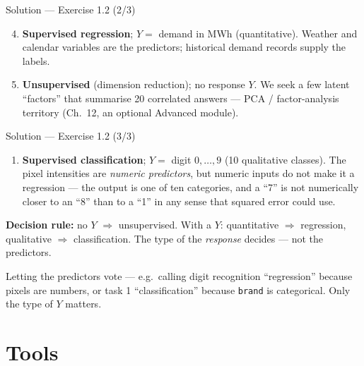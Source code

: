 \documentclass[aspectratio=169,11pt]{beamer}
\begin{document}
\begin{frame}{Solution --- Exercise 1.2 (2/3)}
\begin{solutionbox}
\begin{enumerate}\setcounter{enumi}{3}
  \item \textbf{Supervised regression}; $Y=$ demand in MWh
        (quantitative). Weather and calendar variables are the
        predictors; historical demand records supply the labels.
  \item \textbf{Unsupervised} (dimension reduction); no response $Y$.
        We seek a few latent ``factors'' that summarise 20 correlated
        answers --- PCA / factor-analysis territory (Ch.~12, an
        optional Advanced module).
  \end{enumerate}
\end{solutionbox}
\end{frame}

\begin{frame}{Solution --- Exercise 1.2 (3/3)}
\begin{solutionbox}
  \begin{enumerate}
  \item \textbf{Supervised classification}; $Y=$ digit $0,\ldots,9$
        (10 qualitative classes). The pixel intensities are
        \emph{numeric predictors}, but numeric inputs do not make it a
        regression --- the output is one of ten categories, and a
        ``7'' is not numerically closer to an ``8'' than to a ``1'' in
        any sense that squared error could use.
\end{enumerate}
\textbf{Decision rule:} no $Y$ $\Rightarrow$ unsupervised. With a $Y$:
quantitative $\Rightarrow$ regression, qualitative $\Rightarrow$
classification. The type of the \emph{response} decides --- not the
predictors.
\end{solutionbox}
\begin{mistake}
Letting the predictors vote --- e.g.\ calling
digit recognition ``regression'' because pixels are numbers, or task 1
``classification'' because \texttt{brand} is categorical. Only the
type of $Y$ matters.
\end{mistake}
\end{frame}


\section{Tools}
\end{document}
